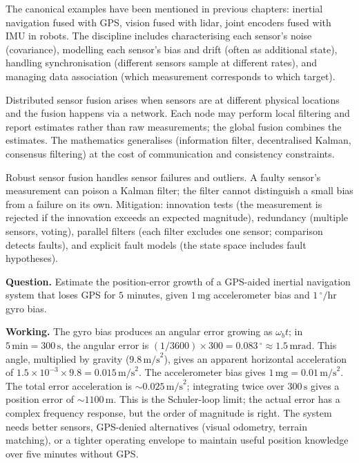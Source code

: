 The canonical examples have been mentioned in previous chapters: inertial navigation fused with GPS, vision fused with lidar, joint encoders fused with IMU in robots. The discipline includes characterising each sensor's noise (covariance), modelling each sensor's bias and drift (often as additional state), handling synchronisation (different sensors sample at different rates), and managing data association (which measurement corresponds to which target).

Distributed sensor fusion arises when sensors are at different physical locations and the fusion happens via a network. Each node may perform local filtering and report estimates rather than raw measurements; the global fusion combines the estimates. The mathematics generalises (information filter, decentralised Kalman, consensus filtering) at the cost of communication and consistency constraints.

Robust sensor fusion handles sensor failures and outliers. A faulty sensor's measurement can poison a Kalman filter; the filter cannot distinguish a small bias from a failure on its own. Mitigation: innovation tests (the measurement is rejected if the innovation exceeds an expected magnitude), redundancy (multiple sensors, voting), parallel filters (each filter excludes one sensor; comparison detects faults), and explicit fault models (the state space includes fault hypotheses).

\begin{estimation}
\textbf{Question.} Estimate the position-error growth of a GPS-aided inertial navigation system that loses GPS for $5$ minutes, given $1\,\text{mg}$ accelerometer bias and $1\,^\circ/\text{hr}$ gyro bias.

\textbf{Working.} The gyro bias produces an angular error growing as $\omega_b t$; in $5\,\text{min} = 300\,\text{s}$, the angular error is $(1/3600) \times 300 = 0.083\,^\circ \approx 1.5\,\text{mrad}$. This angle, multiplied by gravity ($9.8\,\text{m/s}^2$), gives an apparent horizontal acceleration of $1.5\times 10^{-3} \times 9.8 = 0.015\,\text{m/s}^2$. The accelerometer bias gives $1\,\text{mg} = 0.01\,\text{m/s}^2$. The total error acceleration is $\sim 0.025\,\text{m/s}^2$; integrating twice over $300\,\text{s}$ gives a position error of $\sim 1100\,\text{m}$. This is the Schuler-loop limit; the actual error has a complex frequency response, but the order of magnitude is right. The system needs better sensors, GPS-denied alternatives (visual odometry, terrain matching), or a tighter operating envelope to maintain useful position knowledge over five minutes without GPS.
\end{estimation}

